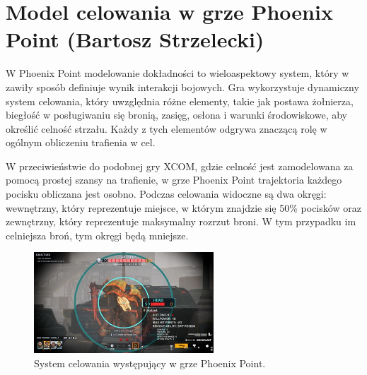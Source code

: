 \section{Model celowania w grze Phoenix Point (Bartosz Strzelecki)}

W Phoenix Point modelowanie dokładności to wieloaspektowy system, który w zawiły sposób definiuje wynik interakcji bojowych. 
Gra wykorzystuje dynamiczny system celowania, który uwzględnia różne elementy, takie jak postawa żołnierza, biegłość w posługiwaniu się bronią, zasięg, 
osłona i warunki środowiskowe, aby określić celność strzału. Każdy z tych elementów odgrywa znaczącą rolę w ogólnym obliczeniu trafienia w cel.

W przeciwieństwie do podobnej gry XCOM, gdzie celność jest zamodelowana za pomocą prostej szansy na trafienie, w grze Phoenix Point
trajektoria każdego pocisku obliczana jest osobno. Podczas celowania widoczne są dwa okręgi: wewnętrzny, który reprezentuje miejsce,
w którym znajdzie się 50\% pocisków oraz zewnętrzny, który reprezentuje maksymalny rozrzut broni. W tym przypadku im celniejsza broń, tym
okręgi będą mniejsze.
\begin{figure}[h]
\centering
\includegraphics[width=0.6\textwidth]{images/point}
\caption{System celowania występujący w grze Phoenix Point.}
\label{fig:acc}
\end{figure}
